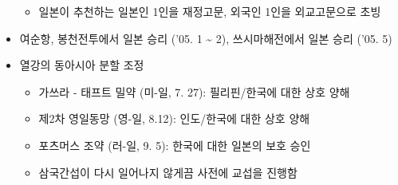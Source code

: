\begin{itemize}
    \begin{itemize}
        \item 일본이 추천하는 일본인 1인을 재정고문, 외국인 1인을 외교고문으로 초빙
    \end{itemize}
    \item 여순항, 봉천전투에서 일본 승리 ('05. 1 \textasciitilde{} 2), 쓰시마해전에서 일본 승리 ('05. 5)
    \item 열강의 동아시아 분할 조정
    \begin{itemize}
        \item 가쓰라 - 태프트 밀약 (미-일, 7. 27): 필리핀/한국에 대한 상호 양해
        \item 제2차 영일동망 (영-일, 8.12): 인도/한국에 대한 상호 양해
        \item 포츠머스 조약 (러-일, 9. 5): 한국에 대한 일본의 보호 승인
        \item 삼국간섭이 다시 일어나지 않게끔 사전에 교섭을 진행함
    \end{itemize}
\end{itemize}

